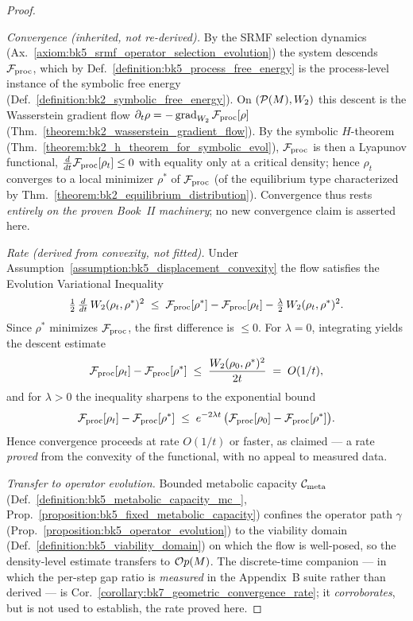 \begin{proof}
\label{proof:bk5_operator_convergence}
\leavevmode

\emph{Convergence (inherited, not re-derived).} By the SRMF selection dynamics (Ax.~\ref{axiom:bk5_srmf_operator_selection_evolution}) the system descends $\mathcal{F}_{\text{proc}}$, which by Def.~\ref{definition:bk5_process_free_energy} is the process-level instance of the symbolic free energy (Def.~\ref{definition:bk2_symbolic_free_energy}). On $(\mathcal{P}(M),W_2)$ this descent is the Wasserstein gradient flow $\partial_t \rho = -\operatorname{grad}_{W_2}\mathcal{F}_{\text{proc}}[\rho]$ (Thm.~\ref{theorem:bk2_wasserstein_gradient_flow}). By the symbolic $H$-theorem (Thm.~\ref{theorem:bk2_h_theorem_for_symbolic_evol}), $\mathcal{F}_{\text{proc}}$ is then a Lyapunov functional, $\tfrac{d}{dt}\mathcal{F}_{\text{proc}}[\rho_t]\le 0$ with equality only at a critical density; hence $\rho_t$ converges to a local minimizer $\rho^{\ast}$ of $\mathcal{F}_{\text{proc}}$ (of the equilibrium type characterized by Thm.~\ref{theorem:bk2_equilibrium_distribution}). Convergence thus rests \emph{entirely on the proven Book~II machinery}; no new convergence claim is asserted here.

\emph{Rate (derived from convexity, not fitted).} Under Assumption~\ref{assumption:bk5_displacement_convexity} the flow satisfies the Evolution Variational Inequality
\[
\tfrac{1}{2}\,\tfrac{d}{dt}\,W_2(\rho_t,\rho^{\ast})^2 \;\le\; \mathcal{F}_{\text{proc}}[\rho^{\ast}] - \mathcal{F}_{\text{proc}}[\rho_t] - \tfrac{\lambda}{2}\,W_2(\rho_t,\rho^{\ast})^2 .
\]
Since $\rho^{\ast}$ minimizes $\mathcal{F}_{\text{proc}}$, the first difference is $\le 0$. For $\lambda = 0$, integrating yields the descent estimate
\[
\mathcal{F}_{\text{proc}}[\rho_t] - \mathcal{F}_{\text{proc}}[\rho^{\ast}] \;\le\; \frac{W_2(\rho_0,\rho^{\ast})^2}{2t} \;=\; O(1/t),
\]
and for $\lambda > 0$ the inequality sharpens to the exponential bound
\[
\mathcal{F}_{\text{proc}}[\rho_t] - \mathcal{F}_{\text{proc}}[\rho^{\ast}] \;\le\; e^{-2\lambda t}\,\bigl(\mathcal{F}_{\text{proc}}[\rho_0] - \mathcal{F}_{\text{proc}}[\rho^{\ast}]\bigr).
\]
Hence convergence proceeds at rate $O(1/t)$ or faster, as claimed --- a rate \emph{proved} from the convexity of the functional, with no appeal to measured data.

\emph{Transfer to operator evolution.} Bounded metabolic capacity $\mathcal{C}_{\text{meta}}$ (Def.~\ref{definition:bk5_metabolic_capacity_mc_}, Prop.~\ref{proposition:bk5_fixed_metabolic_capacity}) confines the operator path $\gamma$ (Prop.~\ref{proposition:bk5_operator_evolution}) to the viability domain (Def.~\ref{definition:bk5_viability_domain}) on which the flow is well-posed, so the density-level estimate transfers to $\mathcal{O}p(M)$. The discrete-time companion --- in which the per-step gap ratio is \emph{measured} in the Appendix~B suite rather than derived --- is Cor.~\ref{corollary:bk7_geometric_convergence_rate}; it \emph{corroborates}, but is not used to establish, the rate proved here.
\end{proof}
